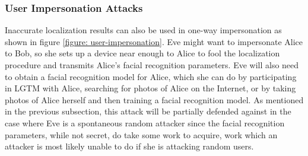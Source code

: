 \documentclass[12pt]{report}
\begin{document}
\subsubsection{User Impersonation Attacks}
Inaccurate localization results can also be used in one-way impersonation as shown in figure \ref{figure: user-impersonation}. Eve might want to impersonate Alice to Bob, so she sets up a device near enough to Alice to fool the localization procedure and transmits Alice's facial recognition parameters. Eve will also need to obtain a facial recognition model for Alice, which she can do by participating in LGTM with Alice, searching for photos of Alice on the Internet, or by taking photos of Alice herself and then training a facial recognition model. As mentioned in the previous subsection, this attack will be partially defended against in the case where Eve is a spontaneous random attacker since the facial recognition parameters, while not secret, do take some work to acquire, work which an attacker is most likely unable to do if she is attacking random users. \par
\end{document}
